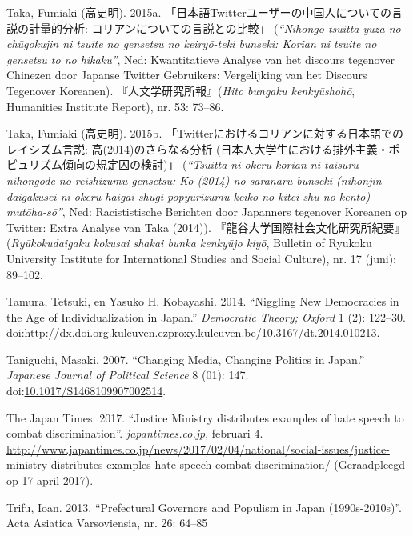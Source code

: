 \documentclass[10.5pt,dutch,]{article}
\begin{document}
\hypertarget{ref-takaux5ftwitterux5f2015-1}{}
Taka, Fumiaki (高史明). 2015a. 「日本語Twitterユーザーの中国人についての言説の計量的分析: コリアンについての言説との比較」 (\emph{“Nihongo tsuittā yūzā no chūgokujin ni tsuite no gensetsu no keiryō-teki bunseki: Korian ni tsuite no gensetsu to no hikaku”}, Ned: Kwantitatieve Analyse van het discours tegenover Chinezen door Japanse Twitter Gebruikers: Vergelijking van het Discours Tegenover Koreanen).  『人文学研究所報』(\emph{Hito bungaku kenkyūshohō}, Humanities Institute Report), nr. 53: 73–86.

\hypertarget{ref-takaux5ftwitterux5f2015}{}
Taka, Fumiaki (高史明). 2015b. 「Twitterにおけるコリアンに対する日本語でのレイシズム言説: 高(2014)のさらなる分析 (日本人大学生における排外主義・ポピュリズム傾向の規定囚の検討)」 (\emph{“Tsuittā ni okeru korian ni taisuru nihongode no reishizumu gensetsu: Kō (2014) no saranaru bunseki (nihonjin daigakusei ni okeru haigai shugi popyurizumu keikō no kitei-shū no kentō) mutōha-sō”}, Ned: Racististische Berichten door Japanners tegenover Koreanen op Twitter: Extra Analyse van Taka (2014)).  『龍谷大学国際社会文化研究所紀要』(\emph{Ryūkokudaigaku kokusai shakai bunka kenkyūjo kiyō}, Bulletin of Ryukoku University Institute for International Studies and Social Culture), nr. 17 (juni): 89--102.

\hypertarget{ref-tamuraux5fnigglingux5f2014}{}
Tamura, Tetsuki, en Yasuko H. Kobayashi. 2014. “Niggling New Democracies
in the Age of Individualization in Japan.” \emph{Democratic Theory;
Oxford} 1 (2): 122--30.
doi:\href{https://doi.org/http://dx.doi.org.kuleuven.ezproxy.kuleuven.be/10.3167/dt.2014.010213}{http://dx.doi.org.kuleuven.ezproxy.kuleuven.be/10.3167/dt.2014.010213}.

\hypertarget{ref-taniguchiux5fchangingux5f2007}{}
Taniguchi, Masaki. 2007. “Changing Media, Changing Politics in Japan.”
\emph{Japanese Journal of Political Science} 8 (01): 147.
doi:\href{https://doi.org/10.1017/S1468109907002514}{10.1017/S1468109907002514}.

\hypertarget{ref-theux5fjapanux5ftimesux5fjusticeux5f2017}{}
The Japan Times. 2017. “Justice Ministry distributes examples of hate speech to combat discrimination”. \emph{japantimes.co.jp}, februari 4. \url{http://www.japantimes.co.jp/news/2017/02/04/national/social-issues/justice-ministry-distributes-examples-hate-speech-combat-discrimination/} (Geraadpleegd op 17 april 2017).

\hypertarget{ref-trifuux5fprefecturalux5f2013}{}
Trifu, Ioan. 2013. “Prefectural Governors and Populism in Japan (1990s-2010s)”. Acta Asiatica Varsoviensia, nr. 26: 64–85
\end{document}
